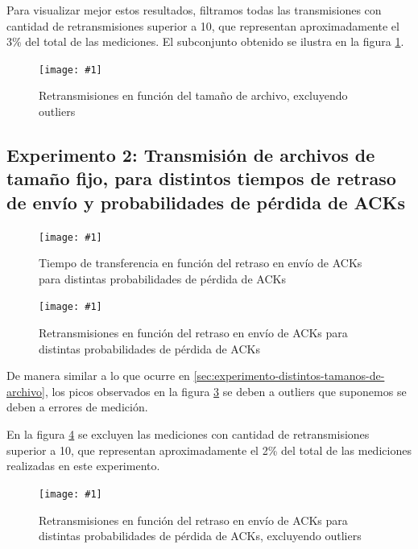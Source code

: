 \documentclass[a4paper, 10pt, twoside]{article}
\newcommand{\grafico}[3]{
  \begin{figure}[H]
    \texttt{[image: \#1]}
    \caption{#2}
    \label{#3}
  \end{figure}
}
\begin{document}
Para visualizar mejor estos resultados, filtramos todas las transmisiones con cantidad de retransmisiones superior a 10, que representan aproximadamente el 3\% del total de las mediciones. El subconjunto obtenido se ilustra en la figura \ref{plot:retransmissions_vs_size_wo_outliers}.

\grafico{retransmissions_vs_size_wo_outliers}
        {Retransmisiones en función del tamaño de archivo, excluyendo outliers}
        {plot:retransmissions_vs_size_wo_outliers}


\subsection{Experimento 2: Transmisión de archivos de tamaño fijo, para distintos tiempos de retraso de envío y probabilidades de pérdida de ACKs}

\grafico{time_vs_delay_and_loss_probability}
        {Tiempo de transferencia en función del retraso en envío de ACKs para distintas probabilidades de pérdida de ACKs}
        {plot:time_vs_delay_and_loss_probability}

\grafico{retransmissions_vs_delay_and_loss_probability}
        {Retransmisiones en función del retraso en envío de ACKs para distintas probabilidades de pérdida de ACKs}
        {plot:retransmissions_vs_delay_and_loss_probability}

De manera similar a lo que ocurre en \ref{sec:experimento-distintos-tamanos-de-archivo}, los picos observados en la figura \ref{plot:retransmissions_vs_delay_and_loss_probability} se deben a outliers que suponemos se deben a errores de medición.

En la figura \ref{plot:retransmissions_vs_delay_and_loss_probability_wo_outliers} se excluyen las mediciones con cantidad de retransmisiones superior a 10, que representan aproximadamente el 2\% del total de las mediciones realizadas en este experimento.

\grafico{retransmissions_vs_delay_and_loss_probability_wo_outliers}
        {Retransmisiones en función del retraso en envío de ACKs para distintas probabilidades de pérdida de ACKs, excluyendo outliers}
        {plot:retransmissions_vs_delay_and_loss_probability_wo_outliers}


\end{document}
